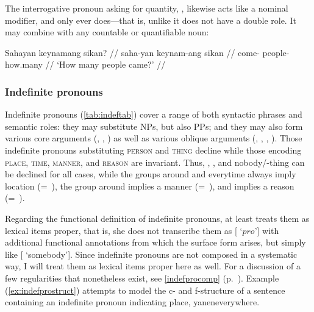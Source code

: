 \xe

The interrogative pronoun asking for quantity, , likewise acts like a nominal modifier, and only ever does---that is,
unlike  it does not have a double role. It may combine with
any countable or quantifiable noun:

\ex\begingl
\gla Sahayan keynamang sikan? //
\glb saha-yan keynam-ang sikan //
\glc come-\TplM{} people-\Aarg{} how.many //
\glft `How many people came?' //
\endgl\xe

\subsubsection{Indefinite pronouns}

Indefinite pronouns (\autoref{tab:indeftab}) cover a range of both syntactic
phrases and semantic roles: they may substitute NPs, but also PPs; and they may
also form various core arguments (\Subj{}, \Obj{}, ) as well as
various oblique arguments (\Possr, , , ).
Those indefinite pronouns substituting \textsc{person} and \textsc{thing}
decline while those encoding \textsc{place}, \textsc{time}, \textsc{manner},
and \textsc{reason} are invariant. Thus, , , and
 {nobody/\mbox{-thing}} can be declined for all cases, while
the groups around  and 
{everytime} always imply location (=~\Loc{}), the group around
 implies a manner (=~\Ins{}), and
 implies a reason (=~\Caus{}).

Regarding the functional definition of indefinite pronouns, at least
\citet{dalrymple2001} treats them as lexical items proper, that is, she does
not transcribe them as [\Pred{} `$pro$'] with additional functional annotations
from which the surface form arises, but simply like [\Pred{} `somebody']. Since
indefinite pronouns are not composed in a systematic way, I will treat them as
lexical items proper here as well. For a discussion of a few regularities that
nonetheless exist, see \autoref{indefprocomp} (p.~\pageref{indefprocomp}).
Example (\ref{ex:indefprostruct}) attempts to model the c- and f-structure of a
sentence containing an indefinite pronoun indicating place, 
{yanen}{everywhere}.

